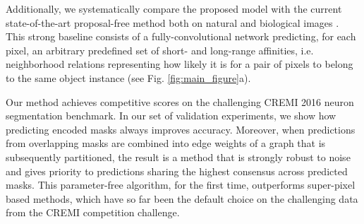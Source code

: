 
Additionally, we systematically compare the proposed model with the current state-of-the-art proposal-free method both on natural and biological images \cite{liu2018affinity,Gao_2019_ICCV,lee2017superhuman,wolf2018mutex,bailoni2019generalized}. This strong baseline consists of a fully-convolutional network predicting, for each pixel, an arbitrary predefined set of short- and long-range affinities, i.e. neighborhood relations representing how likely it is for a pair of pixels to belong to the same object instance (see Fig. \ref{fig:main_figure}a). 

Our method achieves competitive scores on the challenging CREMI 2016 neuron segmentation benchmark. In our set of validation experiments, we show how predicting encoded \maskname masks always improves accuracy. Moreover, when predictions from overlapping masks are combined into edge weights of a graph that is subsequently partitioned, the result is a method that is strongly robust to noise and gives priority to predictions sharing the highest consensus across predicted masks. 
This parameter-free algorithm, for the first time, outperforms super-pixel based methods, which have so far been the default choice on the challenging data from the CREMI competition challenge.







